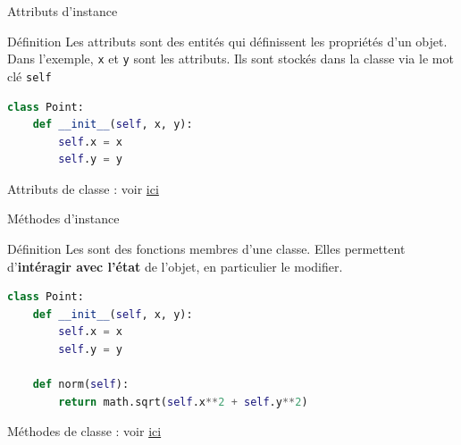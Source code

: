 \documentclass[10pt]{beamer}
\begin{document}
\begin{frame}[fragile]{Attributs d'instance}

  \begin{block}{Définition}
    \medskip
    Les attributs sont des entités qui définissent les propriétés d'un objet. Dans l'exemple, \texttt{x} et \texttt{y} sont les attributs. Ils sont stockés dans la classe via le mot clé \texttt{self}
  \end{block}

\begin{lstlisting}[language=Python, numbers=none]
class Point:
    def __init__(self, x, y):
        self.x = x
        self.y = y
\end{lstlisting}

\begin{center}
\end{center}

Attributs de classe : voir \href{https://docs.python.org/3/tutorial/classes.html#class-and-instance-variables}{ici}

\end{frame}









\begin{frame}[fragile]{Méthodes d'instance}

  \begin{block}{Définition}
    \medskip
    Les sont des fonctions membres d'une classe. Elles permettent d'\textbf{intéragir avec l'état} de l'objet, en particulier le modifier.

  \end{block}
\begin{lstlisting}[language=Python, numbers=none]
class Point:
    def __init__(self, x, y):
        self.x = x
        self.y = y

    def norm(self):
        return math.sqrt(self.x**2 + self.y**2)
\end{lstlisting}

Méthodes de classe : voir \href{https://www.geeksforgeeks.org/class-method-vs-static-method-python/}{ici}

\end{frame}
\end{document}
